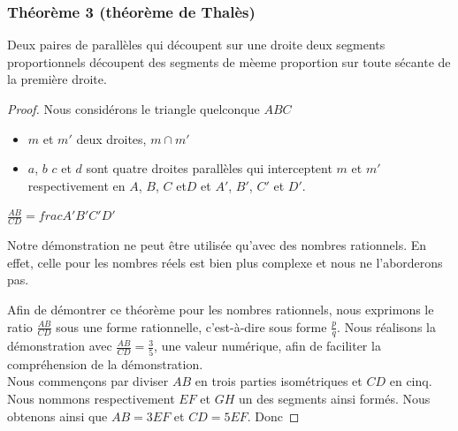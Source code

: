 \documentclass[a4paper,12pt]{article}
\begin{document}
\pagebreak
\subsubsection{Théorème 3 (théorème de Thalès)}
\begin{theorem}
Deux paires de parallèles qui découpent sur une droite deux segments proportionnels découpent des segments de mèeme proportion sur toute sécante de la première droite.
\end{theorem}

\begin{proof}
Nous considérons le triangle quelconque $ABC$ 
\begin{hyp}
\begin{itemize}
    \item $m$ et $m'$ deux droites, $m \cap m'$
    \item $a$, $b$ $c$ et $d$ sont quatre droites parallèles qui interceptent $m$ et $m'$ respectivement en $A$, $B$, $C$ et$D$ et $A'$, $B'$, $C'$ et $D'$.
\end{itemize}
\end{hyp}

\begin{concl}
$\frac{AB}{CD} = frac{A'B'}{C'D'}$
\end{concl}

\begin{remark}
Notre démonstration ne peut être utilisée qu'avec des nombres rationnels. En effet, celle pour les nombres réels est bien plus complexe et nous ne l'aborderons pas.
\end{remark}

Afin de démontrer ce théorème pour les nombres rationnels, nous exprimons le ratio $\frac{AB}{CD}$ sous une forme rationnelle, c'est-à-dire sous forme $\frac{p}{q}$. Nous réalisons la démonstration avec $\frac{AB}{CD} = \frac{3}{5}$, une valeur numérique, afin de faciliter la compréhension de la démonstration.\\
Nous commençons par diviser $AB$ en trois parties isométriques et $CD$ en cinq. Nous nommons respectivement $EF$ et $GH$ un des segments ainsi formés.
Nous obtenons ainsi que $AB = 3EF$ et $CD = 5EF$. Donc 

\end{proof}
\end{document}
